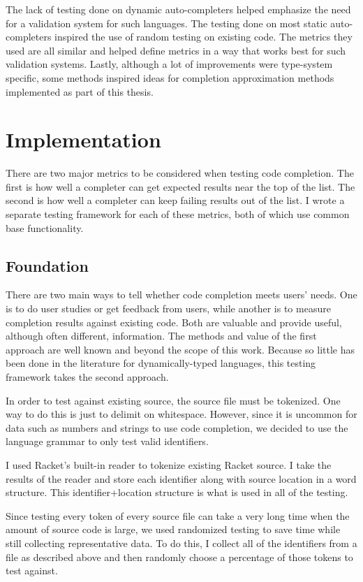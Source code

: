 \documentclass[ms,electronic,twosidetoc,letterpaper,chaptercenter,parttop,lol,lof,lot]{byumsphd}
\begin{document}
The lack of testing done on dynamic auto-completers helped emphasize the need for a
validation system for such languages. The testing done on most static auto-completers
inspired the use of random testing on existing code. The metrics they used are all similar
and helped define metrics in a way that works best for such validation systems. Lastly,
although a lot of improvements were type-system specific, some methods inspired ideas for
completion approximation methods implemented as part of this thesis.

\chapter{Implementation}

There are two major metrics to be considered when testing code completion. The first is
how well a completer can get expected results near the top of the list. The second is how
well a completer can keep failing results out of the list. I wrote a separate testing
framework for each of these metrics, both of which use common base functionality.

\section{Foundation}

There are two main ways to tell whether code completion meets users' needs. One is to do
user studies or get feedback from users, while another is to measure completion results
against existing code. Both are valuable and provide useful, although often different,
information. The methods and value of the first approach are well known and beyond the
scope of this work. Because so little has been done in the literature for
dynamically-typed languages, this testing framework takes the second approach.

In order to test against existing source, the source file must be tokenized. One way to do
this is just to delimit on whitespace. However, since it is uncommon for data such as
numbers and strings to use code completion, we decided to use the language grammar to only
test valid identifiers.

I used Racket's built-in reader to tokenize existing Racket source. I take the results of
the reader and store each identifier along with source location in a word structure. This
identifier+location structure is what is used in all of the testing.

Since testing every token of every source file can take a very long time when the amount
of source code is large, we used randomized testing to save time while still collecting
representative data. To do this, I collect all of the identifiers from a file as described
above and then randomly choose a percentage of those tokens to test against.
\end{document}

